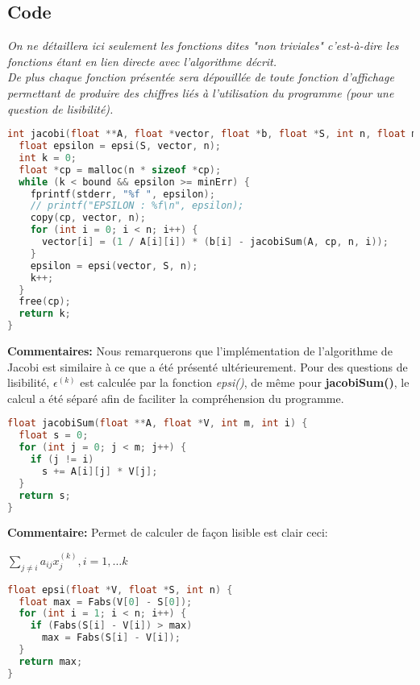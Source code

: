 \subsection{Code}
\textit{On ne détaillera ici seulement les fonctions dites "non triviales" c'est-à-dire les fonctions étant en lien directe avec l'algorithme décrit.\\De plus chaque fonction présentée sera dépouillée de toute fonction d'affichage permettant de produire des chiffres liés à l'utilisation du programme (pour une question de lisibilité).}
\begin{lstlisting}[language=C,inputencoding=utf8, basicstyle=\fontsize{8}{10}\selectfont,caption=jacobi.c]
int jacobi(float **A, float *vector, float *b, float *S, int n, float minErr,int bound) {
  float epsilon = epsi(S, vector, n);
  int k = 0;
  float *cp = malloc(n * sizeof *cp);
  while (k < bound && epsilon >= minErr) {
    fprintf(stderr, "%f ", epsilon);
    // printf("EPSILON : %f\n", epsilon);
    copy(cp, vector, n);
    for (int i = 0; i < n; i++) {
      vector[i] = (1 / A[i][i]) * (b[i] - jacobiSum(A, cp, n, i));
    }
    epsilon = epsi(vector, S, n);
    k++;
  }
  free(cp);
  return k;
}

\end{lstlisting}
\textbf{Commentaires:} Nous remarquerons que l'implémentation de l'algorithme de Jacobi est similaire à ce que a été présenté ultérieurement. Pour des questions de lisibilité, $\epsilon^{(k)}$ est calculée par la fonction \textit{epsi()}, de même pour \textbf{jacobiSum()}, le calcul a été séparé afin de faciliter la compréhension du programme.
\begin{lstlisting}[language=C,inputencoding=utf8, basicstyle=\fontsize{8}{10}\selectfont,caption=jacobiSum() function in "source.h"]
float jacobiSum(float **A, float *V, int m, int i) {
  float s = 0;
  for (int j = 0; j < m; j++) {
    if (j != i)
      s += A[i][j] * V[j];
  }
  return s;
}
\end{lstlisting}
\textbf{Commentaire:} Permet de calculer de façon lisible est clair ceci: \\
\begin{center}
$\sum \limits_{j \neq i} a_{ij}x_j^{(k)}, i=1,\ldots k$
\end{center}
\begin{lstlisting}[language=C,inputencoding=utf8, basicstyle=\fontsize{8}{10}\selectfont,caption=epsi() function in "source.h"]
float epsi(float *V, float *S, int n) {
  float max = Fabs(V[0] - S[0]);
  for (int i = 1; i < n; i++) {
    if (Fabs(S[i] - V[i]) > max)
      max = Fabs(S[i] - V[i]);
  }
  return max;
}
\end{lstlisting}
